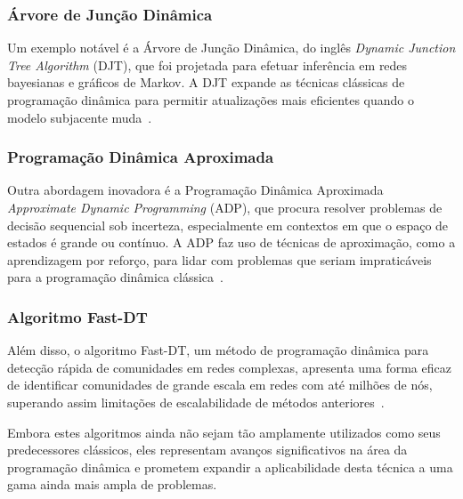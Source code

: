 \subsubsection{Árvore de Junção Dinâmica}

Um exemplo notável é a Árvore de Junção Dinâmica, do inglês \textit{Dynamic Junction Tree Algorithm} (DJT), que foi projetada para efetuar inferência em redes bayesianas e gráficos de Markov. A DJT expande as técnicas clássicas de programação dinâmica para permitir atualizações mais eficientes quando o modelo subjacente muda~\cite{murphy1999loopy}. 

\subsubsection{Programação Dinâmica Aproximada}

Outra abordagem inovadora é a Programação Dinâmica Aproximada \textit{Approximate Dynamic Programming} (ADP), que procura resolver problemas de decisão sequencial sob incerteza, especialmente em contextos em que o espaço de estados é grande ou contínuo. A ADP faz uso de técnicas de aproximação, como a aprendizagem por reforço, para lidar com problemas que seriam impraticáveis para a programação dinâmica clássica~\cite{powell2007approximate}.

\subsubsection{Algoritmo Fast-DT}

Além disso, o algoritmo Fast-DT, um método de programação dinâmica para detecção rápida de comunidades em redes complexas, apresenta uma forma eficaz de identificar comunidades de grande escala em redes com até milhões de nós, superando assim limitações de escalabilidade de métodos anteriores~\cite{li2018fast}. 

Embora estes algoritmos ainda não sejam tão amplamente utilizados como seus predecessores clássicos, eles representam avanços significativos na área da programação dinâmica e prometem expandir a aplicabilidade desta técnica a uma gama ainda mais ampla de problemas.